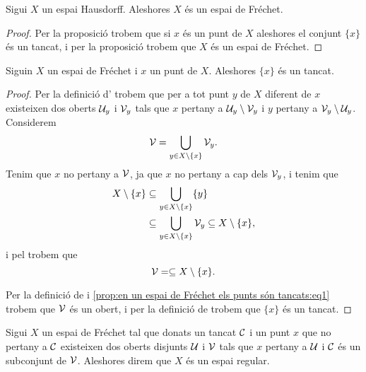 \documentclass[../Apunts.tex]{subfiles}
\begin{document}
	\begin{corollary}
		\label{cor:els espais Hausdorff són Fréchet}
		Sigui \(X\) un espai Hausdorff. Aleshores \(X\) és un espai de Fréchet.
		\begin{proof}
			Per la proposició  trobem que si \(x\) és un punt de \(X\) aleshores el conjunt \(\{x\}\) és un tancat, i per la proposició  trobem que \(X\) és un espai de Fréchet.
		\end{proof}
	\end{corollary}
	\begin{proposition}
		\label{prop:en un espai de Fréchet els punts són tancats}
		Siguin \(X\) un espai de Fréchet i \(x\) un punt de \(X\). Aleshores \(\{x\}\) és un tancat.
		\begin{proof}
			Per la definició d' trobem que per a tot punt \(y\) de \(X\) diferent de \(x\) existeixen dos oberts \(\mathcal{U}_{y}\) i \(\mathcal{V}_{y}\) tals que \(x\) pertany a \(\mathcal{U}_{y}\setminus\mathcal{V}_{y}\) i \(y\) pertany a \(\mathcal{V}_{y}\setminus\mathcal{U}_{y}\). Considerem
			\begin{equation}
				\label{prop:en un espai de Fréchet els punts són tancats:eq1}
				\mathcal{V}=\bigcup_{y\in X\setminus\{x\}}\mathcal{V}_{y}.
			\end{equation}
			Tenim que \(x\) no pertany a \(\mathcal{V}\), ja que \(x\) no pertany a cap dels \(\mathcal{V}_{y}\), i tenim que
			\begin{align*}
				X\setminus\{x\}&\subseteq\bigcup_{y\in X\setminus\{x\}}\{y\} \\
				&\subseteq\bigcup_{y\in X\setminus\{x\}}\mathcal{V}_{y}\subseteq X\setminus\{x\},
			\end{align*}
			i pel  trobem que
			\[\mathcal{V}=\subseteq X\setminus\{x\}.\]
			
			Per la definició de  i \eqref{prop:en un espai de Fréchet els punts són tancats:eq1} trobem que \(\mathcal{V}\) és un obert, i per la definició de   trobem que \(\{x\}\) és un tancat.
		\end{proof}
	\end{proposition}
	\begin{definition}
		\label{def:espai regular}
		Sigui \(X\) un espai de Fréchet tal que donats un tancat \(\mathcal{C}\) i un punt \(x\) que no pertany a \(\mathcal{C}\) existeixen dos oberts disjunts \(\mathcal{U}\) i \(\mathcal{V}\) tals que \(x\) pertany a \(\mathcal{U}\) i \(\mathcal{C}\) és un subconjunt de \(\mathcal{V}\). Aleshores direm que \(X\) és un espai regular.
	\end{definition}
\end{document}
